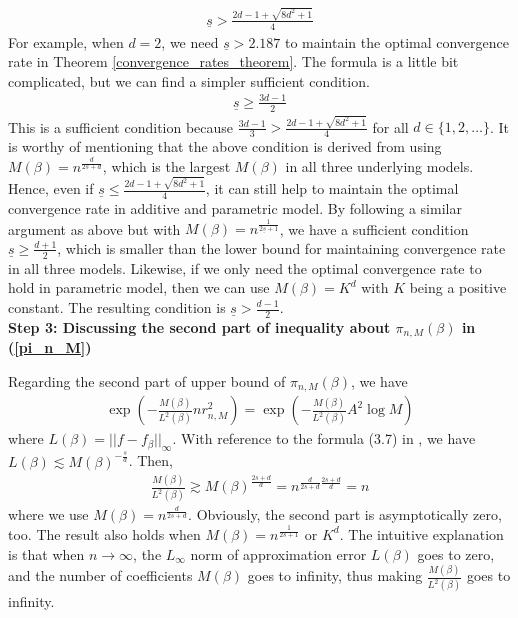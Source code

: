         \begin{align*}
            \underline{s} > \frac{2d-1+\sqrt{8d^2+1}}{4}
        \end{align*}
        For example, when $d=2$, we need $\underline{s}>2.187$ to maintain the optimal convergence rate in Theorem \ref{convergence_rates_theorem}. The formula is a little bit complicated, but we can find a simpler sufficient condition.
        \begin{align*}
            \underline{s}\ge\frac{3d-1}{2}
        \end{align*}
        This is a sufficient condition because $\frac{3d-1}{3}>\frac{2d-1+\sqrt{8d^2+1}}{4}$ for all $d \in \{1,2,\ldots\}$. It is worthy of mentioning that the above condition is derived from using $M(\beta)=n^{\frac{d}{2s+d}}$, which is the largest $M(\beta)$ in all three underlying models. \\
                        
        Hence, even if $\underline{s} \le \frac{2d-1+\sqrt{8d^2+1}}{4}$, it can still help to maintain the optimal convergence rate in additive and parametric model. By following a similar argument as above but with $M(\beta)=n^{\frac{1}{2\underline{s}+1}}$, we have a sufficient condition $\underline{s}\ge \frac{d+1}{2}$, which is smaller than the lower bound for maintaining convergence rate in all three models. Likewise, if we only need the optimal convergence rate to hold in parametric model, then we can use $M(\beta)=K^d$ with $K$ being a positive constant. The resulting condition is $\underline{s}> \frac{d-1}{2}$. \\

        \textbf{Step 3: Discussing the second part of inequality about $\pi_{n,M}(\beta)$ in (\ref{pi_n_M})}

        Regarding the second part of upper bound of $\pi_{n,M}(\beta)$, we have
        \begin{align*}
            \exp\left( -\frac{M(\beta)}{L^2(\beta)}nr_{n,M}^2 \right)=\exp\left( -\frac{M(\beta)}{L^2(\beta)}A^2\log M \right)
        \end{align*}
        where $L(\beta)=||f-f_{\beta}||_{\infty}$. With reference to the formula (3.7) in \cite{Belloni_Chernozhukov_Chetverikov_Kato_2015}, we have $L(\beta) \lesssim M(\beta)^{-\frac{s}{d}}$. Then, 
        \begin{align*}
            \frac{M(\beta)}{L^2(\beta)} \gtrsim M(\beta)^{\frac{2s+d}{d}} = n^{\frac{d}{2s+d}\frac{2s+d}{d}}=n
        \end{align*}
        where we use $M(\beta)=n^{\frac{d}{2s+d}}$. Obviously, the second part is asymptotically zero, too. The result also holds when $M(\beta)=n^{\frac{1}{2s+1}}$ or $K^d$. The intuitive explanation is that when $n \rightarrow \infty$, the $L_{\infty}$ norm of approximation error $L(\beta)$ goes to zero, and the number of coefficients $M(\beta)$ goes to infinity, thus making $\frac{M(\beta)}{L^2(\beta)}$ goes to infinity. 
        
